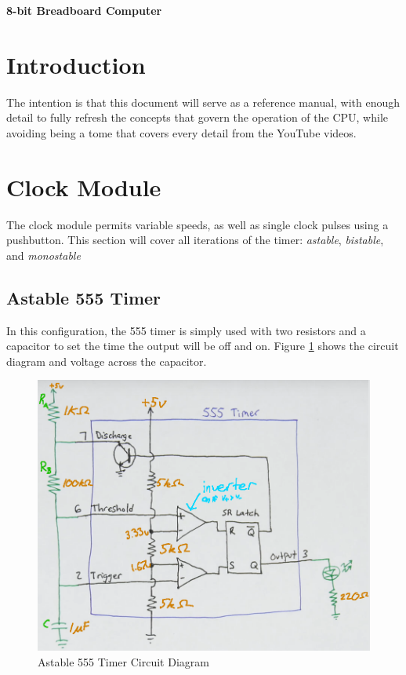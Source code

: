 \documentclass[12pt]{article}
\begin{document}
\begin{titlepage}
\begin{center}
\large
\vspace{0.8cm}
\textbf{8-bit Breadboard Computer}\\
\end{center}
\end{titlepage}



\begin{FlushLeft}

\section*{Introduction}
The intention is that this document will serve as a reference manual, with enough detail to fully refresh the concepts that govern the operation of the CPU, while avoiding being a tome that covers every detail from the YouTube videos.
\clearpage


\section{Clock Module}
The clock module permits variable speeds, as well as single clock pulses using a pushbutton. This section will cover all iterations of the timer: \textit{astable}, \textit{bistable}, and \textit{monostable}


\subsection{Astable 555 Timer} 
In this configuration, the 555 timer is simply used with two resistors and a capacitor to set the time the output will be off and on. Figure \ref{fig:astable_circuit_diagram} shows the circuit diagram and voltage across the capacitor. \\

\begin{figure}[h]
  \begin{center}
    \includegraphics[width=0.8\linewidth]{../modules/clock/astable_circuit_diagram.png}
    \caption{Astable 555 Timer Circuit Diagram}
    \label{fig:astable_circuit_diagram}
  \end{center}
\end{figure}


\end{FlushLeft}
\end{document}
